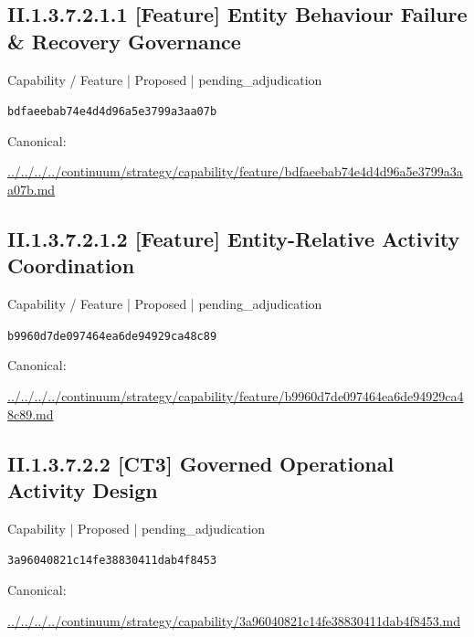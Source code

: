 \documentclass[10pt,a4paper]{article}
\begin{document}
\subsection*{II.1.3.7.2.1.1 [Feature] Entity Behaviour Failure \& Recovery Governance}
\label{element-bdfaeebab74e4d4d96a5e3799a3aa07b}
{\small Capability / Feature | Proposed | pending\_adjudication}\par
\texttt{bdfaeebab74e4d4d96a5e3799a3aa07b}\par
Canonical: \par
{\footnotesize\url{../../../../continuum/strategy/capability/feature/bdfaeebab74e4d4d96a5e3799a3aa07b.md}}\par
\subsection*{II.1.3.7.2.1.2 [Feature] Entity-Relative Activity Coordination}
\label{element-b9960d7de097464ea6de94929ca48c89}
{\small Capability / Feature | Proposed | pending\_adjudication}\par
\texttt{b9960d7de097464ea6de94929ca48c89}\par
Canonical: \par
{\footnotesize\url{../../../../continuum/strategy/capability/feature/b9960d7de097464ea6de94929ca48c89.md}}\par
\subsection*{II.1.3.7.2.2 [CT3] Governed Operational Activity Design}
\label{element-3a96040821c14fe38830411dab4f8453}
{\small Capability | Proposed | pending\_adjudication}\par
\texttt{3a96040821c14fe38830411dab4f8453}\par
Canonical: \par
{\footnotesize\url{../../../../continuum/strategy/capability/3a96040821c14fe38830411dab4f8453.md}}\par
\end{document}
